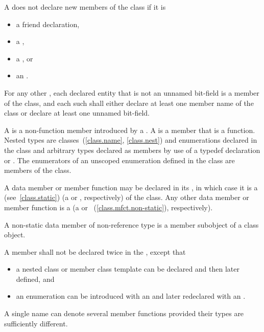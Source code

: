 \pnum
A  does not declare new members of the class
if it is
\begin{itemize}
\item a friend declaration,
\item a ,
\item a , or
\item an .
\end{itemize}
For any other ,
each declared entity
that is not an unnamed bit-field
is a member of the class,
and each such 
shall either
declare at least one member name of the class
or declare at least one unnamed bit-field.

\pnum
A  is a non-function member introduced by a
.
A  is a member that is a function.
Nested types are classes~(\ref{class.name}, \ref{class.nest}) and
enumerations declared in the class and arbitrary types
declared as members by use of a typedef declaration
or .
The enumerators of an unscoped enumeration defined in the class
are members of the class.

%
%
%
\pnum
A data member or member function
may be declared  in its ,
in which case it is a  (see~\ref{class.static})
(a  or
, respectively)
of the class.
Any other data member or member function is a 
(a  or
~(\ref{class.mfct.non-static}), respectively).
\begin{note} A non-static data member of non-reference
type is a member subobject of a class object.\end{note}

\pnum
A member shall not be declared twice in the
, except that
\begin{itemize}
\item a nested class or member
class template can be declared and then later defined, and
\item an
enumeration can be introduced with an  and later
redeclared with an .
\end{itemize}
\begin{note}
A single name can denote several member functions provided their types
are sufficiently different.
\end{note}

